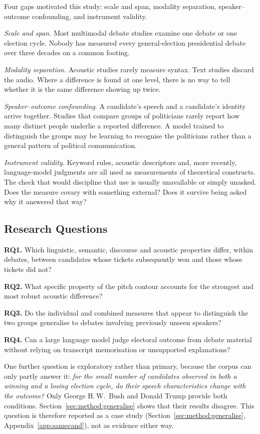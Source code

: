 \documentclass[pdflatex,sn-mathphys-num]{sn-jnl}%
\begin{document}
Four gaps motivated this study: scale and span, modality separation,
speaker--outcome confounding, and instrument validity.

\emph{Scale and span.} Most multimodal debate studies examine one debate or
one election cycle. Nobody has measured every general-election presidential
debate over three decades on a common footing.

\emph{Modality separation.} Acoustic studies rarely measure syntax. Text
studies discard the audio. Where a difference is found at one level, there
is no way to tell whether it is the same difference showing up twice.

\emph{Speaker--outcome confounding.} A candidate's speech and a candidate's
identity arrive together. Studies that compare groups of politicians rarely
report how many distinct people underlie a reported difference. A model
trained to distinguish the groups may be learning to recognise the
politicians rather than a general pattern of political communication.

\emph{Instrument validity.} Keyword rules, acoustic descriptors and, more
recently, language-model judgments are all used as measurements of
theoretical constructs. The check that would discipline that use is usually
unavailable or simply unasked. Does the measure covary with something
external? Does it survive being asked why it answered that way?

\subsection{Research Questions}
\label{sec:intro:rq}

\textbf{RQ1.} Which linguistic, semantic, discourse and acoustic properties
differ, within debates, between candidates whose tickets subsequently won and
those whose tickets did not?

\textbf{RQ2.} What specific property of the pitch contour accounts for the
strongest and most robust acoustic difference?

\textbf{RQ3.} Do the individual and combined measures that appear to
distinguish the two groups generalise to debates involving previously unseen
speakers?

\textbf{RQ4.} Can a large language model judge electoral outcome from debate
material without relying on transcript memorisation or unsupported
explanations?

One further question is exploratory rather than primary, because the corpus
can only partly answer it: \emph{for the small number of candidates observed
in both a winning and a losing election cycle, do their speech
characteristics change with the outcome?} Only George H.\,W.\ Bush and Donald
Trump provide both conditions. Section~\ref{sec:method:generalise}
shows that their results disagree. This question is therefore reported as a case study
(Section~\ref{sec:method:generalise}, Appendix~\ref{app:samecand}), not as
evidence either way.
\end{document}
